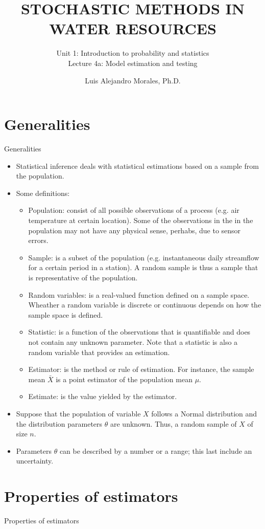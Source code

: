\documentclass[8pt]{beamer}
\title{STOCHASTIC METHODS IN WATER RESOURCES}
\subtitle{Unit 1: Introduction to probability and statistics \\ Lecture 4a: Model estimation and testing}
\author{Luis Alejandro Morales, Ph.D.}
\institute{Universidad Nacional de Colombia \\ Department of Civil and Agriculture Engineering} %
\renewcommand{\emph}[1]{\textcolor{myorange}{#1}}
\begin{document}
\begin{frame}
    \titlepage
\end{frame}

\section{Generalities}
\begin{frame}{Generalities}
    \begin{itemize}
        \item Statistical inference deals with  statistical estimations based on a \emph{sample} from the \emph{population}.
        \item Some definitions:
            \begin{itemize}
                \item \alert{Population}: consist of all possible observations of a process (e.g. air temperature at certain location). Some of the observations in the in the population may not have any physical sense, perhabs, due to sensor errors. 
                \item \alert{Sample}: is a subset of the population (e.g. instantaneous daily streamflow for a certain period in a station). A \emph{random sample} is thus a sample that is representative of the population.
                \item \alert{Random variables}: is a \emph{real-valued function} defined on a \emph{sample space}. Wheather a random variable is \emph{discrete} or \emph{continuous} depends on how the sample space is defined. 
                \item \alert{Statistic}: is a function of the observations that is quantifiable and does not contain any unknown parameter. Note that a \emph{statistic} is also a random variable that provides an \emph{estimation}.
                \item \alert{Estimator}: is the method or rule of estimation. For instance, the \emph{sample mean} $\bar{X}$ is a point estimator of the \emph{population mean} $\mu$. 
                \item \alert{Estimate}: is the value yielded by the estimator. 
                 \end{itemize}
             \item Suppose that the population of variable $X$ follows a \emph{Normal distribution} and the distribution parameters $\theta$ are unknown. Thus, a random sample of $X$ of size $n$.
             \item Parameters $\theta$ can be described by a number or a range; this last include an uncertainty. 
    \end{itemize}
\end{frame}

\section{Properties of estimators}
\begin{frame}{Properties of estimators}

\end{frame}
    
\end{document}
